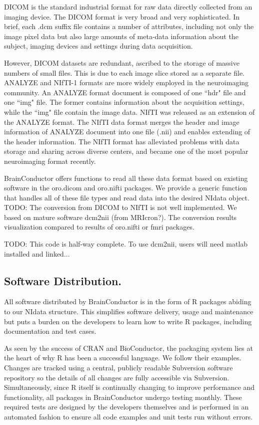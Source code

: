 \documentclass{nature}
\begin{document}
DICOM is the standard industrial
format for raw data directly collected from an imaging device. The DICOM format
is very broad and very sophisticated. In brief, each .dcm suffix file contains a
number of attributes, including not only the image pixel data but also large
amounts of meta-data information about the subject, imaging devices and settings
during data acquisition.

However, DICOM datasets are redundant, ascribed to the storage of massive
numbers of small files. This is due to each image slice stored as a separate
file. ANALYZE and NIfTI-1 formats are more widely employed in the neuroimaging
community. An ANALYZE format document is composed of one ``hdr" file and one
``img" file. The former contains information about the acquisition settings,
while the ``img" file contain the image data. NIfTI was released as an extension
of the ANALYZE format. The NIfTI data format merges the header and image
information of ANALYZE document into one file (.nii) and enables extending of
the header information. The NIfTI format has alleviated problems with data
storage and sharing across diverse centers, and became one of the most popular
neuroimaging format recently.

BrainConductor offers functions to read all these data format
based on existing software in the oro.dicom and oro.nifti packages. We
provide a generic function that handles all of these file types and read data
into the desired NIdata object.
{\color{red} TODO: The conversion from DICOM to NIfTI is not well implemented.
We based on mature
software dcm2nii (from MRIcron?). The conversion results visualization compared
to results of
oro.nifti or fmri packages.}

{\color{red}TODO: This code is half-way complete. To use dcm2nii, users will
need
matlab installed and linked...}

\subsection{Software Distribution.}

All software distributed by BrainConductor is in the form of R packages abiding
to our NIdata structure. This
simplifies software delivery, usage and maintenance but puts a burden on the
developers
to learn how to write R packages, including documentation and test cases.

As seen by the success of CRAN and BioConductor, the packaging system lies
at the heart of why R has been a successful language. We follow their examples.
Changes are tracked using a central, publicly readable Subversion software
repository
so the details of all changes are fully accessible via Subversion.
Simultaneously, since
R itself is continually changing to improve performance and functionality, all
packages
in BrainConductor undergo testing monthly. These required tests are designed by
the
developers themselves and is performed in an automated fashion to ensure
all code examples and unit tests run without errors.
\end{document}
